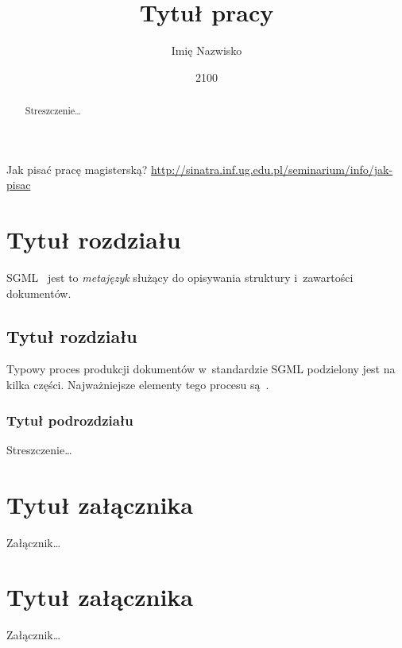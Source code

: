 \documentclass[brudnopis]{xmgr}
\author   {Imię Nazwisko}
\title    {Tytuł pracy}
\date     {2100}
\begin{document}
\begin{abstract}
  Streszczenie…
\end{abstract}

\maketitle

\introduction

Jak pisać pracę magisterską?
\url{http://sinatra.inf.ug.edu.pl/seminarium/info/jak-pisac}

\chapter{Tytuł rozdziału}

SGML~\cite{Goldfarb:2002:CFG} jest to \emph{metajęzyk} 
służący do opisywania struktury i~zawartości dokumentów.
    
\section{Tytuł rozdziału}

Typowy proces produkcji dokumentów w~standardzie SGML
podzielony jest na kilka części. Najważniejsze elementy tego
procesu są~\cite[opisane tutaj]{Eisenberg:2002:SXM}.

\subsection{Tytuł podrozdziału}

\summary

Streszczenie…

\appendix
\chapter{Tytuł załącznika}

Załącznik…

\chapter{Tytuł załącznika}

Załącznik…






\oswiadczenie
\end{document}
